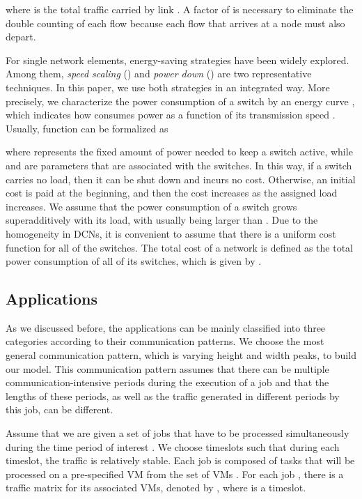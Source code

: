 \documentclass[journal,single-space,two column,twoside,10pt]{IEEEtran}
\begin{document}
where  is the total traffic carried by link . A factor of  is necessary to eliminate the double counting of each flow because each flow that arrives at a node must also depart.

For single network elements, energy-saving strategies have been widely explored. Among them, \emph{speed scaling} (\cite{Yao_Demers-1995, Bansal_Kimbrel-2007, Gunaratne_Christensen-2008, Andrews_Fernandez-2010}) and \emph{power down} (\cite{Nedevschi_Popa-2008, Parnaby_Zimmerman-2008}) are two representative techniques. 
In this paper, we use both strategies in an integrated way. More precisely, we characterize the power consumption of a switch  by an energy curve , which indicates how  consumes power as a function of its transmission speed . Usually, function  can be formalized as

where  represents the fixed amount of power needed to keep a switch active, while  and  are parameters that are associated with the switches. In this way, if a switch carries no load, then it can be shut down and incurs no cost. Otherwise, an initial cost is paid at the beginning, and then the cost increases as the assigned load increases. We assume that the power consumption of a switch grows superadditively with its load, with  usually being larger than  \cite{Andrews_Fernandez-2010}. Due to the homogeneity in DCNs, it is convenient to assume that there is a uniform cost function  for all of the switches. The total cost of a network is defined as the total power consumption of all of its switches, which is given by .

\vspace{-0.2cm}

\subsection{Applications}

As we discussed before, the applications can be mainly classified into three categories according to their communication patterns. We choose the most general communication pattern, which is varying height and width peaks, to build our model. This communication pattern assumes that there can be multiple communication-intensive periods during the execution of a job and that the lengths of these periods, as well as the traffic generated in different periods by this job, can be different.

Assume that we are given a set  of jobs that have to be processed simultaneously during the time period of interest .
We choose timeslots such that during each timeslot, the traffic is relatively stable.
Each job  is composed of  tasks that will be processed on a pre-specified VM  from the set of VMs . For each job , there is a traffic matrix for its  associated VMs, denoted by , where  is a timeslot.
\end{document}
